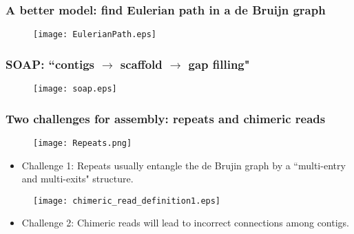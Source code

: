 \documentclass[mathserif]{beamer}
\begin{document}
	\begin{frame}
		\frametitle{A better model: find Eulerian path in a  de Bruijn graph }
		                          \begin{figure}
				\centering
				\texttt{[image: EulerianPath.eps]}
			\end{figure}
	\end{frame}




	
	
	
\begin{frame}
		\frametitle{SOAP: ``contigs $\rightarrow$ scaffold $\rightarrow$ gap filling"}
			\begin{figure}
				\centering
				\texttt{[image: soap.eps]}
			\end{figure}
	\end{frame}
	
	
		\begin{frame}
		\frametitle{Two challenges for assembly: repeats and chimeric reads}
		                  \begin{figure}
				\centering
				\texttt{[image: Repeats.png]}
			\end{figure}
		\begin{itemize}
	\item Challenge 1: Repeats usually entangle the de Brujin graph by a ``multi-entry and multi-exits" structure. 
		\end{itemize}
                          \begin{figure}
				\centering
				\texttt{[image: chimeric\_read\_definition1.eps]}
			\end{figure}

	\begin{itemize}
		\item Challenge 2: Chimeric reads will lead to incorrect connections among contigs. 
	\end{itemize}
		\end{frame}

	
\end{document}

